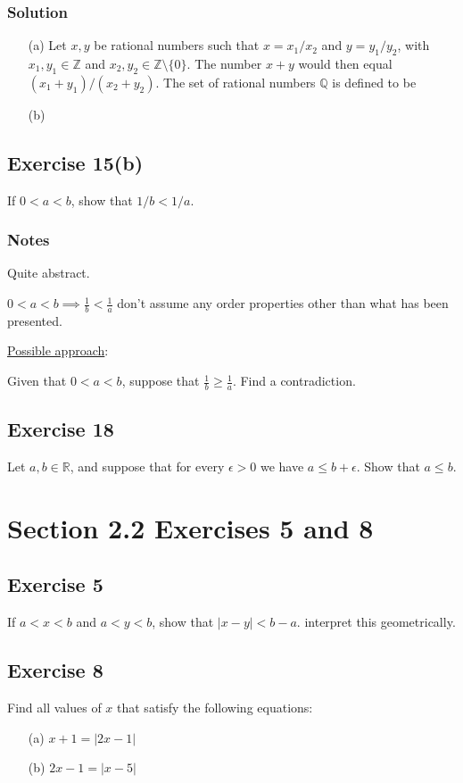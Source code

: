 \documentclass[12pt]{article}
\begin{document}
\begin{flushleft}
\subsubsection*{Solution}
\begin{itemize}
\item[(a)] Let $x, y$ be rational numbers such that $x = x_1 / x_2$ and $y = y_1 / y_2$, with $x_1, y_1 \in \mathbb{Z}$ and $x_2, y_2 \in \mathbb{Z} \setminus \{0\}$. The number $x + y$ would then equal $\left(x_1 + y_1\right)/\left(x_2 + y_2\right)$. The set of rational numbers $\mathbb{Q}$ is defined to be 

\item[(b)]
\end{itemize}

\subsection*{Exercise 15(b)}
If $0 < a < b$, show that $1/b < 1/a$.

\subsubsection*{Notes}
Quite abstract.

$0 < a < b \implies \frac{1}{b} < \frac{1}{a}$ don't assume any order properties other than what has been presented.

\underline{Possible approach}:

Given that $0 < a < b$, suppose that $\frac{1}{b} \geq \frac{1}{a}$. Find a contradiction.

\subsection*{Exercise 18}
Let $a, b \in \mathbb{R}$, and suppose that for every $\epsilon > 0$ we have $a \leq b + \epsilon$. Show that $a \leq b$.

\section*{Section 2.2 Exercises 5 and 8}

\subsection*{Exercise 5}
If $a < x < b$ and $a < y < b$, show that $\left|x - y\right| < b - a$. interpret this geometrically.

\subsection*{Exercise 8}
Find all values of $x$ that satisfy the following equations:
\begin{itemize}
\item[(a)] $x + 1 = \left|2x - 1\right|$
\item[(b)] $2x - 1 = \left|x - 5\right|$
\end{itemize}


\end{flushleft}
\end{document}
